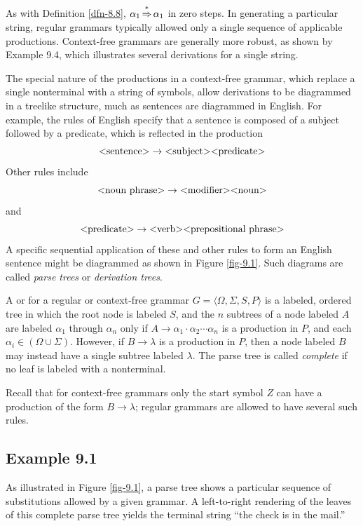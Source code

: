 As with Definition \ref{dfn-8.8}, $\alpha_1\operatorname{\overset{*}{\Rightarrow}}\alpha_1$ in zero steps. In
generating a particular string, regular grammars typically allowed only a single
sequence of applicable productions. Context-free grammars are generally more
robust, as shown by Example 9.4, which illustrates several derivations for a
single string.

The special nature of the productions in a context-free grammar, which
replace a single nonterminal with a string of symbols, allow derivations to be
diagrammed in a treelike structure, much as sentences are diagrammed in English.
For example, the rules of English specify that a sentence is composed of a
subject followed by a predicate, which is reflected in the production
\[ \text{\text{\textless}sentence\text{\textgreater}}\rightarrow \text{\text{\textless}subject\text{\textgreater}}\text{\text{\textless}predicate\text{\textgreater}} \]
Other rules include
\[ \text{\text{\textless}noun phrase\text{\textgreater}}\rightarrow\text{\text{\textless}modifier\text{\textgreater}}\text{\text{\textless}noun\text{\textgreater}} \]
and
\[ \text{\text{\textless}predicate\text{\textgreater}}\rightarrow\text{\text{\textless}verb\text{\textgreater}}\text{\text{\textless}prepositional
	phrase\text{\textgreater}} \]
A specific sequential application of these and other rules to form an English
sentence might be diagrammed as shown in Figure \ref{fig-9.1}. Such diagrams are called
\emph{parse trees} or \emph{derivation trees}.

\begin{dfn}\label{dfn-9.2}
A \emph{} or \emph{} for a regular or
context-free grammar $G=\langle\Omega,\Sigma,S,P\rangle$ is a labeled, ordered
tree in which the root node is labeled $S$, and the $n$ subtrees of a node
labeled $A$ are labeled $\alpha_1$ through $\alpha_n$ only if $A\rightarrow
\alpha_1\cdot\alpha_2\cdots\alpha_n$ is a production in $P$, and each $\alpha_i \in
(\Omega\cup\Sigma)$. However, if $B\rightarrow\lambda$ is a production in $P$,
then a node labeled $B$ may instead have a single subtree labeled $\lambda$. The
parse tree is called \emph{complete} if no leaf is labeled with a nonterminal.
\end{dfn}

Recall that for context-free grammars only the start symbol $Z$ can have a
production of the form $B\rightarrow\lambda$; regular grammars are allowed to
have several such rules.

\subsection*{Example 9.1}

As illustrated in Figure \ref{fig-9.1}, a parse tree shows a particular sequence of
substitutions allowed by a given grammar. A left-to-right rendering of the
leaves of this complete parse tree yields the terminal string ``the check is in
the mail.''

